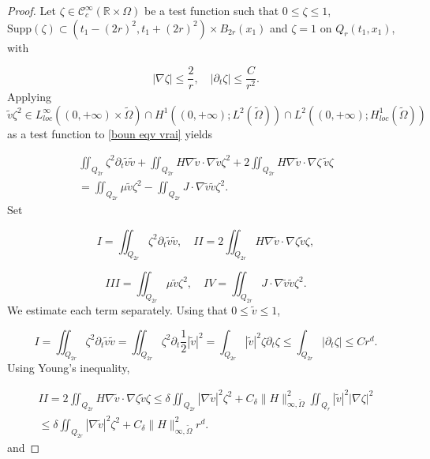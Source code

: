 \documentclass[reqno,12pt,twoside]{amsart}
\numberwithin{equation}{section} \numberwithin{theorem}{section}
\numberwithin{proposition}{section} \numberwithin{lemma}{section}
\numberwithin{corollary}{section}
\numberwithin{definition}{section} \numberwithin{remark}{section}
\begin{document}
\begin{proof}
Let $\zeta\in \mathcal{C}_c^\infty (\mathbb{R}\times \Omega)$ be a test function such that $0\leqslant \zeta \leqslant 1$, $\text{Supp}(\zeta) \subset (t_1-(2r)^2, t_1 +(2r)^2) \times B_{2r}(x_1)$ and $\zeta =1$ on $Q_{r}(t_1, x_1)$, with 

\[|\nabla \zeta| \leqslant \frac{2}{r}, \quad |\partial_t \zeta | \leqslant \frac{C}{r^2}.\]
Applying $\widetilde{v} \zeta^2 \in L_{loc}^\infty((0,+\infty) \times \widetilde{\Omega})\cap H^1((0,+\infty); L^2(\widetilde{\Omega})) \cap L^2((0,+\infty); H_{loc}^1(\widetilde{\Omega}))$ as a test function to \eqref{boun eqv vrai} yields 

\begin{multline}\label{energie tilv 1}
\iint_{Q_{2r}} \zeta^2 \partial_t \widetilde{v} \widetilde{v} + \iint_{Q_{2r}} H\nabla \widetilde{v}\cdot \nabla \widetilde{v} \zeta^2 + 2 \iint_{Q_{2r}} H \nabla \widetilde{v} \cdot \nabla \zeta \, \widetilde{v} \zeta \\
= \iint_{Q_{2r}} \mu \widetilde{v} \zeta^2 - \iint_{Q_{2r}} J\cdot \nabla \widetilde{v} \widetilde{v} \zeta^2.
\end{multline} 
Set 

\[I= \iint_{Q_{2r}} \zeta^2 \partial_t \widetilde{v} \widetilde{v}, \quad II = 2 \iint_{Q_{2r}} H \nabla \widetilde{v} \cdot \nabla \zeta \widetilde{v} \zeta,\]

\[III = \iint_{Q_{2r}} \mu \widetilde{v} \zeta^2, \quad IV = \iint_{Q_{2r}} J\cdot \nabla \widetilde{v} \widetilde{v} \zeta^2.\]
We  estimate each term separately. Using that $0\leqslant \widetilde{v}\leqslant 1$, 

\begin{equation}\label{energie tilv I}
I = \iint_{Q_{2r}} \zeta^2 \partial_t \widetilde{v} \widetilde{v} =\iint_{Q_{2r}} \zeta^2 \partial_t \frac{1}{2}|\widetilde{v}|^2 = \int_{Q_{2r}} |\widetilde{v}|^2 \zeta \partial_t \zeta \leqslant \int_{Q_{2r}} |\partial_t \zeta| \leqslant Cr^{d}.
\end{equation} 
Using Young's inequality,

\begin{multline}\label{energie tilv II}
II = 2 \iint_{Q_{2r}} H \nabla \widetilde{v} \cdot \nabla \zeta \widetilde{v} \zeta \leqslant \delta \iint_{Q_{2r}} |\nabla \widetilde{v}|^2 \zeta^2 + C_\delta \|H\|_{\infty,\widetilde{\Omega}}^2 \iint_{Q_{r}} |\widetilde{v}|^2 |\nabla \zeta|^2\\
\leqslant \delta \iint_{Q_{2r}} |\nabla \widetilde{v}|^2 \zeta^2  + C_\delta \|H\|_{\infty,\widetilde{\Omega}}^2 r^{d}.
\end{multline}
and 


\end{proof}
\end{document}
